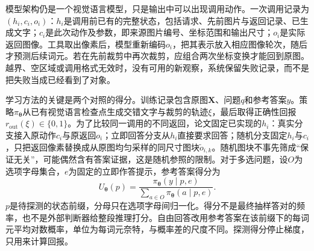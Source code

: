 模型架构仍是一个视觉语言模型，只是输出中可以出现调用动作。一次调用记录为$(h_i,c_i,o_i)$：$h_i$是调用前已有的完整状态，包括请求、先前图片与返回记录、已生成文字；$c_i$是此次动作及参数，即来源图片编号、坐标范围和输出尺寸；$o_i$是实际返回图像。工具取出像素后，模型重新编码$o_i$，把其表示放入相应图像轮次，随后才预测后续词元。若在先前裁剪中再次裁剪，应组合两次坐标变换才能回到原图。越界、空区域或调用格式无效时，没有可用的新观察，系统保留失败记录，而不是把失败当成已经看到了对象。

学习方法的关键是两个对照的得分。训练记录包含原图$\bm X$、问题$q$和参考答案$y$。策略$\pi_{\bm\theta}$从已有视觉语言检查点生成交错文字与裁剪的轨迹$\xi$，最后取得正确性回报$r_{\mathrm{out}}(\xi)\in\{0,1\}$。为了比较同一调用的不同返回，论文固定已实现的$h_i$：真实分支接入原动作$c_i$与原返回$o_i$；立即回答分支从$h_i$直接要求回答；随机分支固定$h_i$与$c_i$，只把返回像素替换成从原图均匀采样的同尺寸图块$\widetilde o_{i,k}$。随机图块不事先筛成“保证无关”，可能偶然含有答案证据，这是随机参照的限制。对于多选问题，设$O$为选项字母集合，$e$为固定的立即作答提示，参考答案得分为
\begin{equation}
  U_{\bm\theta}(p)
   =\frac{\pi_{\bm\theta}(y\mid p,e)}
          {\sum_{a\in O}\pi_{\bm\theta}(a\mid p,e)}.
  \label{eq:vision-countercredit-score}
\end{equation}
$p$是待探测的状态前缀，分母只在选项字母间归一化。得分不是最终抽样答对的频率，也不是外部判断器给整段推理打分。自由回答改用参考答案在该前缀下的每词元平均对数概率，单位为每词元奈特，与概率差的尺度不同。探测得分停止梯度，只用来计算回报。

